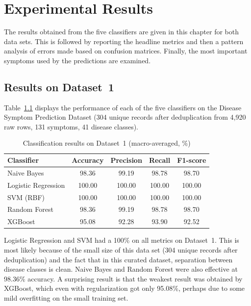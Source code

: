 \chapter{Experimental Results}
\label{ch:results}

The results obtained from the five classifiers are given in this chapter for both data sets. This is followed by reporting the headline metrics and then a pattern analysis of errors made based on confusion matrices. Finally, the most important symptoms used by the predictions are examined.

\section{Results on Dataset~1}
\label{sec:results_dataset1}

Table~\ref{tab:results_dataset1} displays the performance of each of the five classifiers on the Disease Symptom Prediction Dataset (304 unique records after deduplication from 4,920 raw rows, 131 symptoms, 41 disease classes).

\begin{table}[H]
\centering
\caption{Classification results on Dataset~1 (macro-averaged, \%)}
\label{tab:results_dataset1}
\begin{tabular}{@{}lcccc@{}}
\toprule
\textbf{Classifier} & \textbf{Accuracy} & \textbf{Precision} & \textbf{Recall} & \textbf{F1-score} \\
\midrule
Naive Bayes          & 98.36 & 99.19 & 98.78 & 98.70 \\
Logistic Regression  & 100.00 & 100.00 & 100.00 & 100.00 \\
SVM (RBF)            & 100.00 & 100.00 & 100.00 & 100.00 \\
Random Forest        & 98.36 & 99.19 & 98.78 & 98.70 \\
XGBoost              & 95.08 & 92.28 & 93.90 & 92.52 \\
\bottomrule
\end{tabular}
\end{table}

Logistic Regression and SVM had a 100\% on all metrics on Dataset~1. This is most likely because of the small size of this data set (304 unique records after deduplication) and the fact that in this curated dataset, separation between disease classes is clean. Naive Bayes and Random Forest were also effective at 98.36\% accuracy. A surprising result is that the weakest result was obtained by XGBoost, which even with regularization got only 95.08\%, perhaps due to some mild overfitting on the small training set.

